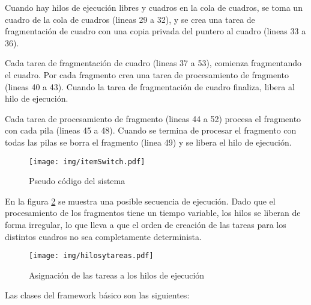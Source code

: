 Cuando hay hilos de ejecución libres y cuadros en la cola de cuadros, se toma un
cuadro de la cola de cuadros (lineas 29 a 32), y se crea una tarea de
fragmentación de cuadro con una copia privada del puntero al cuadro (lineas 33 a
36).

Cada tarea de fragmentación de cuadro (lineas 37 a 53), comienza fragmentando el
cuadro. Por cada fragmento crea una tarea de procesamiento de fragmento (lineas
40 a 43). Cuando la tarea de fragmentación de cuadro finaliza, libera al hilo de
ejecución.

Cada tarea de procesamiento de fragmento (lineas 44 a 52) procesa el fragmento
con cada pila (lineas 45 a 48). Cuando se termina de procesar el fragmento con
todas las pilas se borra el fragmento (linea 49) y se libera el hilo de
ejecución.

\begin{figure}[!h]

	\centering

	\texttt{[image: img/itemSwitch.pdf]}

	\caption{Pseudo código del sistema}

	\label{codigo}

\end{figure}

En la figura \ref{hilosytareas} se muestra una posible secuencia de ejecución.
Dado que el procesamiento de los fragmentos tiene un tiempo variable, los hilos
se liberan de forma irregular, lo que lleva a que el orden de creación de las
tareas para los distintos cuadros no sea completamente determinista.

\begin{figure}[!h]

	\texttt{[image: img/hilosytareas.pdf]}

	\caption{Asignación de las tareas a los hilos de ejecución}

	\label{hilosytareas}

\end{figure}

Las clases del framework básico son las siguientes:

